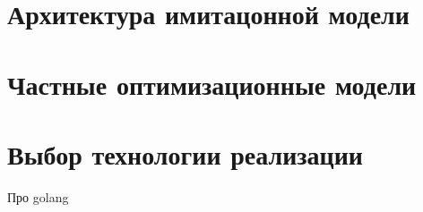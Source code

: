 \section{Архитектура имитацонной модели}

\section{Частные оптимизационные модели}

\section{Выбор технологии реализации}

Про golang